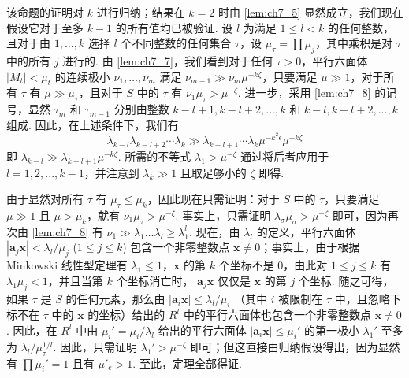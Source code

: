该命题的证明对 $k$ 进行归纳；结果在 $k = 2$ 时由 \autoref{lem:ch7_5} 显然成立，我们现在假设它对于至多 $k-1$ 的所有值均已被验证. 设 $l$ 为满足 $1 \le l < k$ 的任何整数，且对于由 $1, \dots, k$ 选择 $l$ 个不同整数的任何集合 $\tau$，设 $\mu_\tau = \prod \mu_j$，其中乘积是对 $\tau$ 中的所有 $j$ 进行的. 由 \autoref{lem:ch7_7}，我们看到对于任何 $\tau > 0$，平行六面体 $|M_t| < \mu_t$ 的连续极小 $\nu_1, \dots, \nu_m$ 满足 $\nu_{m-1} \gg \nu_m \mu^{-k\zeta}$，只要满足 $\mu \gg 1$，对于所有 $\tau$ 有 $\mu \gg \mu_\tau$，且对于 $S$ 中的 $\tau$ 有 $\nu_1 \mu_\tau > \mu^{-\zeta}$. 进一步，采用 \autoref{lem:ch7_8} 的记号，显然 $\tau_{m}$ 和 $\tau_{m-1}$ 分别由整数 $k-l+1, k-l+2, ..., k$ 和 $k-l, k-l+2, ..., k$ 组成. 因此，在上述条件下，我们有
\[\lambda_{k-l}\lambda_{k-l+2}\cdots\lambda_k \gg \lambda_{k-l+1}\cdots\lambda_k \mu^{-k^2\epsilon}\mu^{-k\zeta}\]
即 $\lambda_{k-l} \gg \lambda_{k-l+1} \mu^{-k\zeta}$. 所需的不等式 $\lambda_1 > \mu^{-\zeta}$ 通过将后者应用于 $l = 1, 2, ..., k - 1$，并注意到 $\lambda_k \gg 1$ 且取足够小的 $\zeta$ 即得.

由于显然对所有 $\tau$ 有 $\mu_\tau \le \mu_k$，因此现在只需证明：对于 $S$ 中的 $\tau$，只要满足 $\mu \gg 1$ 且 $\mu > \mu_k$，就有 $\nu_1 \mu_\tau > \mu^{-\zeta}$. 事实上，只需证明 $\lambda_\sigma \mu_\sigma > \mu^{-\zeta}$ 即可，因为再次由 \autoref{lem:ch7_8} 有 $\nu_1 \gg \lambda_1 \dots \lambda_l \geqslant \lambda_1^{l}$. 现在，由 $\lambda_l$ 的定义，平行六面体 $|\mathbf{a}_j \mathbf{x}| < \lambda_l/\mu_j$ ($1 \leqslant j \leqslant k$) 包含一个非零整数点 $\mathbf{x} \neq 0$；事实上，由于根据 Minkowski 线性型定理有 $\lambda_1 \leqslant 1$，$\mathbf{x}$ 的第 $k$ 个坐标不是 0，由此对 $1\leqslant j \leqslant k$ 有 $\lambda_1\mu_j < 1$，并且当第 $k$ 个坐标消亡时， $\mathbf{a}_j \mathbf{x}$ 仅仅是 $\mathbf{x}$ 的第 $j$ 个坐标. 随之可得，如果 $\tau$ 是 $S$ 的任何元素，那么由 $|\mathbf{a}_i \mathbf{x}| \leqslant \lambda_l/\mu_i$ （其中 $i$ 被限制在 $\tau$ 中，且忽略下标不在 $\tau$ 中的 $\mathbf{x}$ 的坐标）给出的 $R^l$ 中的平行六面体也包含一个非零整数点 $\mathbf{x} \neq 0$. 因此，在 $R^l$ 中由 $\mu_i' = \mu_i/\lambda_l$ 给出的平行六面体 $|\mathbf{a}_i \mathbf{x}| \le \mu_i'$ 的第一极小 $\lambda_1'$ 至多为 $\lambda_l/\mu_\tau^{1/l}$. 因此，只需证明 $\lambda_1' > \mu^{-\zeta}$ 即可；但这直接由归纳假设得出，因为显然有 $\prod \mu_i' = 1$ 且有 $\mu'_e > 1$. 至此，定理全部得证.

